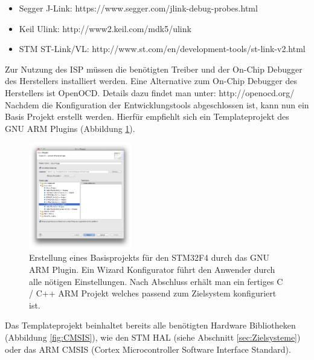 \begin{itemize}
	\item Segger J-Link:
	\newline
	https://www.segger.com/jlink-debug-probes.html
	\item Keil Ulink: 
	\newline
	http://www2.keil.com/mdk5/ulink
	\item STM ST-Link/VL: 
	\newline
	http://www.st.com/en/development-tools/st-link-v2.html
\end{itemize}
Zur Nutzung des ISP müssen die benötigten Treiber und der On-Chip Debugger des Herstellers installiert werden. Eine Alternative zum On-Chip Debugger des Herstellers ist OpenOCD. Details dazu findet man unter:
\newline
\newline
http://openocd.org/
\newline
\newline            
Nachdem die Konfiguration der Entwicklungstools abgeschlossen ist, kann nun ein Basis Projekt erstellt werden. Hierfür empfiehlt sich ein Templateprojekt des GNU ARM Plugins (Abbildung \ref{fig:NewProj}).
\begin{figure}[htb]
	\centering
		\includegraphics[width=0.4\textwidth]{Pictures/Einrichtung/NewF4Project.png}
	\caption{Erstellung eines Basisprojekts für den STM32F4 durch das GNU ARM Plugin. Ein Wizard Konfigurator führt den Anwender durch alle nötigen Einstellungen. Nach Abschluss erhält man ein fertiges C / C++ ARM Projekt welches passend zum Zielsystem konfiguriert ist.}
	\label{fig:NewProj}
\end{figure}
Das Templateprojekt beinhaltet bereits alle benötigten Hardware Bibliotheken (Abbildung \ref{fig:CMSIS}), wie den STM HAL (siehe Abschnitt \ref{sec:Zielsysteme}) oder das ARM CMSIS (Cortex Microcontroller Software Interface Standard).
